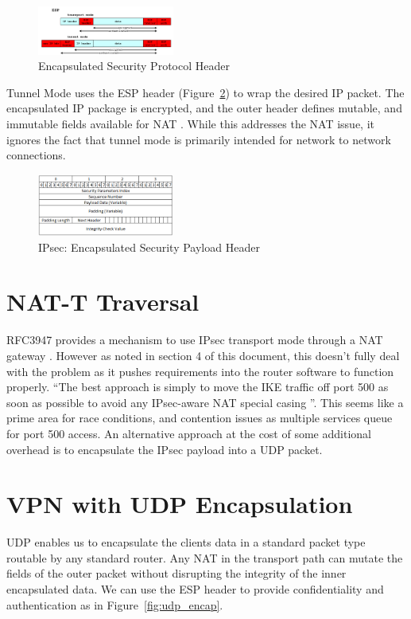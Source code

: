 \documentclass[conference,12pt]{IEEEtran}
\begin{document}
\begin{figure}
\centering
\includegraphics[width=0.4\textwidth]{ESP_example.PNG}
\caption{Encapsulated Security Protocol Header \autocite{ipsec_example}}
\label{fig:esp_example}
\end{figure}


Tunnel Mode uses the ESP header (Figure~\ref{fig:esp}) to wrap the desired IP
packet. The encapsulated IP package is encrypted, and the outer header defines
mutable, and immutable fields available for NAT \autocite{rfc4301}. While this
addresses the NAT issue, it ignores the fact that tunnel mode is primarily
intended for network to network connections.   

\begin{figure}
\centering
\includegraphics[width=0.4\textwidth]{ESP.png}
\caption{IPsec: Encapsulated Security Payload Header}
\label{fig:esp}
\end{figure}

\section{NAT-T Traversal}
RFC3947 provides a mechanism to use IPsec transport mode through a NAT gateway
\autocite{rfc3947}. However as noted in section 4 of this document, this doesn't
fully deal with the problem as it pushes requirements into the router software
to function properly. ``The best approach is simply to move the IKE traffic off port 500 
as soon as possible to avoid any IPsec-aware NAT special casing
\autocite{rfc3947}''.  This seems like a prime area for race
conditions, and contention issues as multiple services queue for port 500
access.  An alternative approach at the cost of
some additional overhead is to encapsulate the IPsec payload into a UDP packet.

\section{VPN with UDP Encapsulation}
UDP enables us to encapsulate the clients data in a standard packet type
routable by any standard router. Any NAT in the transport path can mutate the
fields of the outer packet without disrupting the integrity of the inner
encapsulated data. We can use the ESP header to provide confidentiality and
authentication as in Figure~\ref{fig:udp_encap}.  
\end{document}
